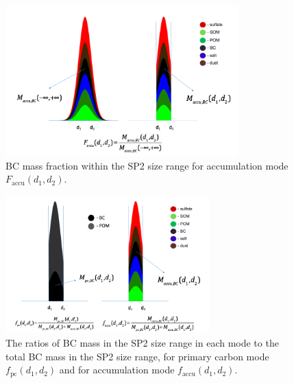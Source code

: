 \documentclass[12pt, fullpage]{uiucthesis2009}
\begin{document}
	\begin{figure}[h] 
		\begin{center}
			\includegraphics[width = 0.8\textwidth]{Rplot06}
			\caption[BC mass fraction within the SP2 size range for accumulation mode $F_{\text{accu}}(d_{1}, d_{2})$]{\label{fig_R2} BC mass fraction within the SP2 size range for accumulation mode $F_{\text{accu}}(d_{1}, d_{2})$.}
		\end{center}
	\end{figure}
	
	\begin{figure}[h] 
		\begin{center}
			\includegraphics[width = 0.7\textwidth]{Rplot07}
			\caption[The ratios of BC mass in the SP2 size range in each mode to the total BC mass in the SP2 size range, for primary carbon mode $f_{\text{pc}}(d_{1}, d_{2})$ and for accumulation mode $f_{\text{accu}}(d_{1}, d_{2})$]{\label{fig_R3} The ratios of BC mass in the SP2 size range in each mode to the total BC mass in the SP2 size range, for primary carbon mode $f_{\text{pc}}(d_{1}, d_{2})$ and for accumulation mode $f_{\text{accu}}(d_{1}, d_{2})$.}
		\end{center}
	\end{figure}
	
\end{document}
